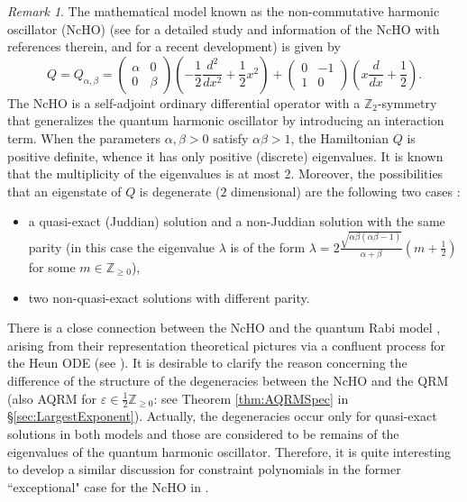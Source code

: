 \documentclass[11pt]{article}
\numberwithin{equation}{section}
\newcommand{\Z}{\mathbb{Z}} %
\newcommand{\e}{\varepsilon}
\theoremstyle{plain}
\theoremstyle{definition}
\theoremstyle{remark}
\newtheorem{rem}{Remark}[section]
\begin{document}
\begin{rem}
  The mathematical model known as the non-commutative harmonic oscillator (NcHO) \cite{PW2001} (see \cite{P2010S} for a detailed study
  and information of the NcHO with references therein, and \cite{P2014Milan} for a recent development) is given by
  \[
    Q = Q_{\alpha,\beta} =
    \begin{pmatrix}
      \alpha & 0\\
      0 &   \beta
    \end{pmatrix}
    \left( - \frac{1}{2} \frac{d^2}{d x^2} + \frac{1}{2} x^2 \right) +
    \begin{pmatrix}
      0 & -1\\
      1 &   0
    \end{pmatrix}
    \left( x \frac{d}{d x} + \frac{1}{2}  \right).
  \]
  The NcHO is a self-adjoint ordinary differential operator with a \(\Z_2\)-symmetry that generalizes the quantum harmonic oscillator by
  introducing an interaction term. When the parameters \(\alpha,\beta >0 \) satisfy \(\alpha \beta > 1\), the Hamiltonian $Q$ is positive definite, whence
  it has only positive (discrete) eigenvalues. It is known \cite{W2013PJA} that the multiplicity of the eigenvalues  is at most $2$. Moreover,
  the possibilities that an eigenstate of $Q$ is degenerate ($2$ dimensional) are the following two cases
  \cite{W2015IMRN}:
  \begin{itemize}
  \item a quasi-exact (Juddian) solution and a non-Juddian solution
    with the same parity (in this case the eigenvalue $\lambda$ is of the form $\lambda=2\frac{\sqrt{\alpha\beta(\alpha\beta-1)}}{\alpha+\beta}(m+\frac12)$ for some $m\in \Z_{\geq0}$),
  \item two non-quasi-exact solutions with different parity.
  \end{itemize}
  There is a close connection between the NcHO and the quantum Rabi model \cite{W2015IMRN}, arising from their representation theoretical pictures
  via a confluent process for the Heun ODE (see \cite{SL2000}). It is desirable to clarify the reason concerning the
  difference of the structure of the degeneracies between the NcHO and the QRM (also AQRM for $\e\in \frac12 \Z_{\geq0}$: see Theorem \ref{thm:AQRMSpec} in
  \S \ref{sec:LargestExponent}). Actually, the degeneracies occur only for quasi-exact solutions in both models and  those are considered to be
  remains of the eigenvalues of the quantum harmonic oscillator. Therefore, it is quite interesting to develop a similar discussion for constraint polynomials in the
  former ``exceptional" case for the NcHO in \cite{W2015IMRN}.
\end{rem}
\end{document}
